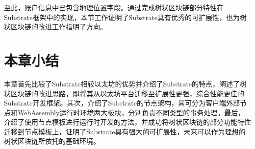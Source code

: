 至此，账户信息中已包含地理位置字段。通过完成树状区块链部分特性在Substrate框架中的实现，本节工作证明了Substrate具有优秀的可扩展性，也为树状区块链的改进工作指明了方向。

\section{本章小结}

本章首先比较了Substrate相较以太坊的优势并介绍了Substrate的特点，阐述了树状区块链的改进思路，即将其从以太坊平台迁移至扩展性更强，综合性能更佳的Substrate开发框架。其次，介绍了Substrate的节点架构，其可分为客户端外部节点和WebAssembly运行时环境两大板块，分别负责不同类型的事务处理。最后，介绍了使用节点模板进行运行时开发的方法，并成功将树状区块链的部分功能特性迁移到节点模板上，证明了Substrate具有强大的可扩展性，未来可以作为理想的树状区块链所依托的基础环境。
